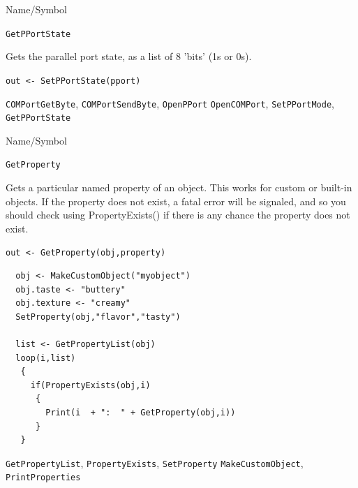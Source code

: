 \begin{desc}{Name/Symbol}
\item[Name/Symbol] \verb+GetPPortState+ 

\item[Description]  
  Gets the parallel port state, as a list of 8 'bits' (1s or 0s).
  
\item[Usage]       
     \verb+out <- SetPPortState(pport)+ 
\item[Example]


\item[See Also]
\verb+COMPortGetByte+, \verb+COMPortSendByte+, \verb+OpenPPort+ \verb+OpenCOMPort+, \verb+SetPPortMode+, \verb+GetPPortState+ 
\end{desc} 


\begin{desc}{Name/Symbol}
\item[Name/Symbol] \verb+GetProperty+ 

\item[Description]  
Gets a particular named property of an object. This works for custom or built-in objects.  If the property does not exist, a fatal error will be signaled, and so you should check using PropertyExists() if there is any chance the property does not exist.
  
\item[Usage]       
     \verb+out <- GetProperty(obj,property)+ 
\item[Example]

\begin{verbatim}
  obj <- MakeCustomObject("myobject")
  obj.taste <- "buttery"
  obj.texture <- "creamy"
  SetProperty(obj,"flavor","tasty")
  
  list <- GetPropertyList(obj)
  loop(i,list)
   {
     if(PropertyExists(obj,i)
      {
        Print(i  + ":  " + GetProperty(obj,i))
      }
   }

\end{verbatim}


\item[See Also]
\verb+GetPropertyList+, \verb+PropertyExists+, \verb+SetProperty+ \verb+MakeCustomObject+, \verb+PrintProperties+ 
\end{desc} 




